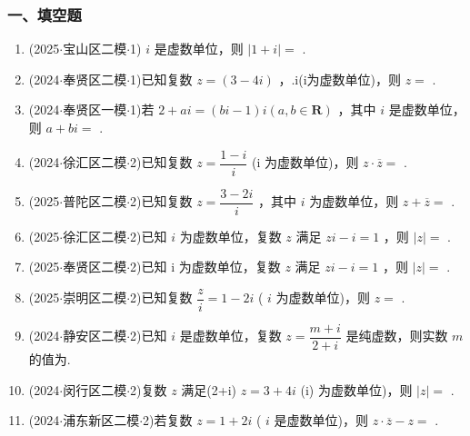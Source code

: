 \subsubsection*{一、填空题}
\begin{enumerate}
    \item (2025$\cdot$宝山区二模$\cdot$1) $i$ 是虚数单位，则 $|1 + i| =$ .

    \item (2024$\cdot$奉贤区二模$\cdot$1)已知复数 $z = \left( {3 - {4i}}\right)$ ，.i(i为虚数单位)，则 $z =$ .

    \item (2024$\cdot$奉贤区一模$\cdot$1)若 $2 + a{i} = \left( {b{i} - 1}\right) {i}\left( {a,b \in  \mathbf{R}}\right)$ ，其中 ${i}$ 是虚数单位，则 $a + b{i} =$ .

    \item (2024$\cdot$徐汇区二模$\cdot$2)已知复数 $z = \dfrac{1 - {i}}{{i}}$ (i 为虚数单位)，则 $z \cdot  \overline{z} =$ .

    \item (2025$\cdot$普陀区二模$\cdot$2)已知复数 $z = \dfrac{3 - 2{i}}{{i}}$ ，其中 ${i}$ 为虚数单位，则 $z + \overline{z} =$ .

    \item (2025$\cdot$徐汇区二模$\cdot$2)已知 ${i}$ 为虚数单位，复数 $z$ 满足 $z{i} - {i} = 1$ ，则 $\left| z\right|  =$ .

    \item (2025$\cdot$奉贤区二模$\cdot$2)已知 i 为虚数单位，复数 $z$ 满足 $z{i} - {i} = 1$ ，则 $\left| z\right|  =$ .

    \item (2025$\cdot$崇明区二模$\cdot$2)已知复数 $\dfrac{z}{{i}} = 1 - 2{i}$ ( ${i}$ 为虚数单位)，则 $z =$ .

    \item (2024$\cdot$静安区二模$\cdot$2)已知 ${i}$ 是虚数单位，复数 $z = \dfrac{m + {i}}{2 + {i}}$ 是纯虚数，则实数 $m$ 的值为.

    \item (2024$\cdot$闵行区二模$\cdot$2)复数 $z$ 满足(2+i) $z = 3 + {4i}$ (i) 为虚数单位)，则 $\left| z\right|  =$ .

    \item (2024$\cdot$浦东新区二模$\cdot$2)若复数 $z = 1 + 2{i}$ ( ${i}$ 是虚数单位)，则 $z \cdot  \overline{z} - z =$ .


\end{enumerate}
